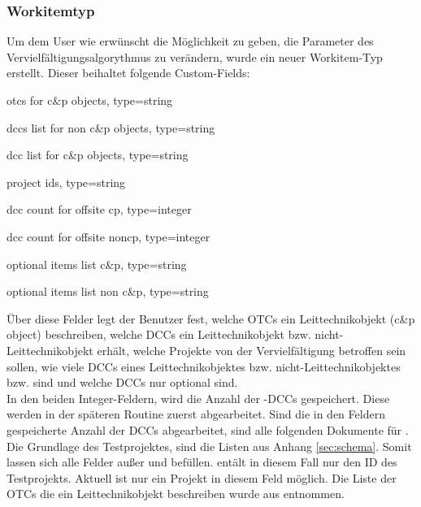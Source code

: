 \subsubsection{Workitemtyp }
\label{sub:propertieswi}
Um dem User wie erwünscht die Möglichkeit zu geben, die Parameter des Vervielfältigungsalgorythmus zu verändern, wurde ein neuer Workitem-Typ  erstellt. Dieser beihaltet folgende Custom-Fields:
\begin{compactitem}
 \item otcs for c\&p objects, type=string
 \item dccs list for non c\&p objects, type=string
 \item dcc list for c\&p objects, type=string
 \item project ids, type=string
 \item dcc count for offsite cp, type=integer
 \item dcc count for offsite noncp, type=integer
 \item optional items list c\&p, type=string
 \item optional items list non c\&p, type=string
\end{compactitem}
Über diese Felder legt der Benutzer fest, welche OTCs ein Leittechnikobjekt (c\&p object) beschreiben, welche DCCs ein Leittechnikobjekt bzw. nicht-Leittechnikobjekt erhält, welche Projekte von der Vervielfältigung betroffen sein sollen, wie viele DCCs eines Leittechnikobjektes bzw. nicht-Leittechnikobjektes  bzw.  sind und welche DCCs nur optional sind.\\
In den beiden Integer-Feldern, wird die Anzahl der -DCCs gespeichert.
Diese werden in der späteren Routine zuerst abgearbeitet. Sind die in den Feldern gespeicherte Anzahl der DCCs abgearbeitet, sind alle folgenden Dokumente für .
Die Grundlage des Testprojektes, sind die Listen aus Anhang \ref{sec:schema}.
Somit lassen sich alle Felder außer  und  befüllen.  entält in diesem Fall nur den ID des Testprojekts. Aktuell ist nur ein Projekt in diesem Feld möglich.
Die Liste der OTCs die ein Leittechnikobjekt beschreiben wurde aus \cite{20} entnommen.
